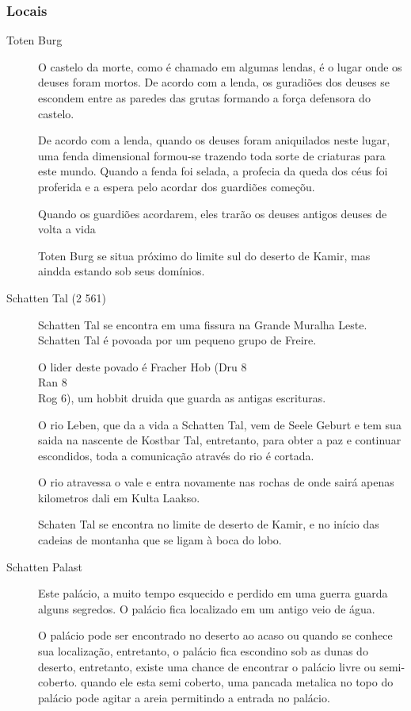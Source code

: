\subsubsection{Locais}
\begin{description}
\item[Toten Burg]
O castelo da morte, como \'e chamado em algumas lendas, \'e o lugar onde
os deuses foram mortos. De acordo com a lenda, os guradi\~oes dos deuses
se escondem entre as paredes das grutas formando a for\c{c}a defensora do castelo.

De acordo com a lenda, quando os deuses foram aniquilados neste lugar,
   uma fenda dimensional formou-se trazendo toda sorte de criaturas
   para este mundo. Quando a fenda foi selada, a profecia da queda
   dos c\'eus foi proferida e a espera pelo acordar dos guardi\~oes come\c{c}\~ou.

Quando os guardi\~oes acordarem, eles trar\~ao os deuses antigos deuses
de volta a vida

Toten Burg se situa pr\'oximo do limite sul do deserto de
Kamir, mas aindda estando sob seus dom\'inios.

\item[Schatten Tal (2 561)]
Schatten Tal se encontra em uma fissura na Grande Muralha Leste.
Schatten Tal \'e povoada por um pequeno grupo de Freire.

O lider deste povado \'e Fracher Hob (Dru 8\\Ran 8\\Rog 6),
um hobbit druida que guarda as antigas escrituras.

O rio Leben, que da a vida a Schatten Tal, vem de Seele Geburt e
tem sua saida na nascente de Kostbar Tal, entretanto, para obter
a paz e continuar escondidos, toda a comunica\c{c}\~ao atrav\'es do
rio \'e cortada.

O rio atravessa o vale e entra novamente nas rochas de onde sair\'a apenas
kilometros dali em Kulta Laakso.

Schaten Tal se encontra no limite de deserto de Kamir, e no in\'icio
das cadeias de montanha que se ligam \`a boca do lobo.

\item[Schatten Palast]
Este pal\'acio, a muito tempo esquecido e perdido em uma guerra
guarda alguns segredos. O pal\'acio fica localizado
em um antigo veio de \'agua.

O pal\'acio pode ser encontrado no deserto ao acaso ou quando se
conhece sua localiza\c{c}\~ao, entretanto, o pal\'acio
fica escondino sob as dunas do deserto, entretanto,
existe uma chance de encontrar o pal\'acio livre ou semi-coberto.
quando ele esta semi coberto, uma pancada metalica no topo
do pal\'acio pode agitar a areia permitindo a entrada no pal\'acio.


\end{description}
